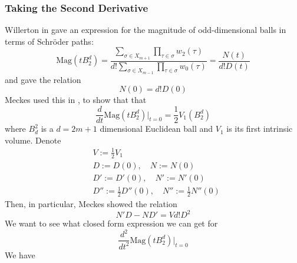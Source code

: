 \documentclass[11pt]{article}
\theoremstyle{definition}
\theoremstyle{definition}
\theoremstyle{plain}
\theoremstyle{plain}
\theoremstyle{plain}
\theoremstyle{definition}
\begin{document}
\subsubsection*{Taking the Second Derivative}
Willerton in \cite{willerton_magnitude_2017} gave an expression for the magnitude of odd-dimensional balls in terms of Schröder paths:
\begin{equation*}
\text{Mag}(tB_2^d) = \frac{\sum\limits_{\sigma\in X_{m+1}}\prod\limits_{\tau\in\sigma}w_2(\tau)}{d!\sum\limits_{\sigma\in X_{m-1}}\prod\limits_{\tau\in\sigma}w_0(\tau)} = \frac{N(t)}{d!D(t)}
\end{equation*}
and gave the relation
\begin{equation*}
N(0) = d!D(0)
\end{equation*}
Meckes used this in \cite{meckes_magnitude_2019}, to show that that
\begin{equation*}
\frac{d}{dt}\text{Mag}(tB_2^d)\big\vert_{t=0} = \frac{1}{2}V_1(B_2^d)
\end{equation*}
where $B_d^2$ is a $d = 2m+1$ dimensional Euclidean ball and $V_1$ is its first intrinsic volume.
Denote 
\begin{align*}
&V := \frac{1}{2}V_1 \\
&D := D(0),\quad N := N(0) \\
&D' := D'(0),\quad N' := N'(0) \\
&D'' := \frac{1}{2}D''(0),\quad N '' := \frac{1}{2}N''(0)
\end{align*}
Then, in particular, Meckes showed the relation
\begin{equation*}
N'D-ND'=Vd!D^2
\end{equation*}
We want to see what closed form expression we can get for
\begin{equation*}
\frac{d^2}{dt^2}\text{Mag}(tB_2^d)\big\vert_{t=0}
\end{equation*}
We have
\end{document}
